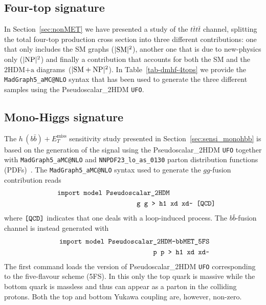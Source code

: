 \documentclass[a4paper, 11pt,notoc]{article}
\newcommand{\MET}{\ensuremath{E_T^\mathrm{miss}}\xspace}
\newcommand{\hdma}{\ensuremath{\textrm{2HDM+a}}\xspace}
\begin{document}
\subsection{Four-top signature}

In Section~\ref{sec:nonMET} we have presented a study of the $t \bar t t \bar t$ channel, splitting the  total four-top production cross section into three different contributions: one that only includes the SM graphs ($|{\rm SM}|^2$), another one that is due to new-physics only ($|{\rm NP}|^2$) and finally a contribution that accounts for both the SM and the \hdma diagrams~($|{\rm SM} + {\rm NP}|^2$). In Table~\ref{tab-dmhf-4tops} we provide the {\tt MadGraph5\_aMC@NLO} syntax that has been used to generate the three different samples using the Pseudoscalar\_2HDM {\tt UFO}. 

\subsection{Mono-Higgs signature}

The $h \, (b \bar b) + \MET$ sensitivity study presented in Section~\ref{sec:sensi_monohbb} is based on the generation of the signal using the Pseudoscalar\_2HDM {\tt UFO} together with {\tt MadGraph5\_aMC@NLO} and {\tt NNPDF23\_lo\_as\_0130} parton distribution functions (PDFs)~\cite{Ball:2012cx}. The {\tt MadGraph5\_aMC@NLO}  syntax used to generate the $gg$-fusion contribution reads 
\begin{eqnarray}
&& \verb| import model Pseudoscalar_2HDM | \hspace{2.25cm} \nonumber \\
&& \verb| g g > h1 xd xd~ [QCD] | \nonumber 
\end{eqnarray}
where  $\verb|[QCD]|$ indicates that one deals with a loop-induced process. The $b \bar b$-fusion channel is instead generated with 
\begin{eqnarray}
&& \verb| import model Pseudoscalar_2HDM-bbMET_5FS  | \nonumber \\
&& \verb| p p > h1 xd xd~  | \nonumber 
\end{eqnarray}
The first command loads the version of Pseudoscalar\_2HDM {\tt UFO}  corresponding to the five-flavour scheme (5FS). In this only the top quark is massive while the bottom quark is massless and thus 
can appear as a parton in the colliding protons. Both the top and bottom Yukawa coupling  are, however, non-zero.
\end{document}
